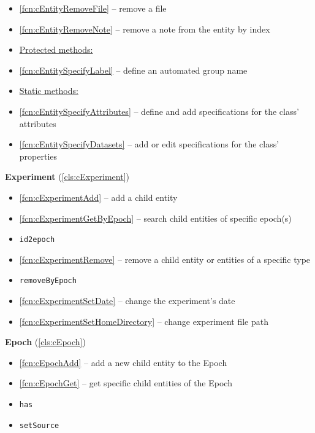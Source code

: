 \documentclass{aodatadocs}
\newcommand{\ret}[1]{\textcolor{purple5}{\texttt{#1}}}
\begin{document}
{\begin{legal}[font=\Large\bfseries, itemsep=1.5ex]
\begin{legal}[font=\large\bfseries, itemsep=1ex]
\begin{itemize}
            \item \ref{fcn:cEntityRemoveFile} -- remove a file
            \item \ref{fcn:cEntityRemoveNote} -- remove a note from the entity by index
            \item[] \hspace{-2.2ex}\underline{Protected methods:}
            \item \ref{fcn:cEntitySpecifyLabel} -- define an automated group name 
            \item[] \hspace{-2.2ex}\underline{Static methods:}
            \item \ref{fcn:cEntitySpecifyAttributes} -- define and add specifications for the class' attributes
            \item \ref{fcn:cEntitySpecifyDatasets} -- add or edit specifications for the class' properties
        \end{itemize}
        \item {\large\textbf{Experiment} (\ref{cls:cExperiment})}
        \begin{itemize}
            \item \ref{fcn:cExperimentAdd} -- add a child entity
            \item \ref{fcn:cExperimentGetByEpoch} -- search child entities of specific epoch(s)
            \item \ret{id2epoch}
            \item \ref{fcn:cExperimentRemove} -- remove a child entity or entities of a specific type
            \item \ret{removeByEpoch}
            \item \ref{fcn:cExperimentSetDate} -- change the experiment's date
            \item \ref{fcn:cExperimentSetHomeDirectory} -- change experiment file path 
        \end{itemize}
        \item {\large\textbf{Epoch} (\ref{cls:cEpoch})}
        \begin{itemize}
            \item \ref{fcn:cEpochAdd} -- add a new child entity to the Epoch
            \item \ref{fcn:cEpochGet} -- get specific child entities of the Epoch
            \item \ret{has}
            \item \ret{setSource}

\end{itemize}
\end{legal}
\end{legal}}
\end{document}
